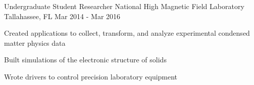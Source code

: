 \begin{cventries}
  \cventry
  {Undergraduate Student Researcher} %
  {National High Magnetic Field Laboratory} %
  {Tallahassee, FL} %
  {Mar 2014 - Mar 2016} %
  {
    \begin{cvitems} %
      \item {Created applications to collect, transform, and analyze experimental condensed matter physics data}
      \item {Built simulations of the electronic structure of solids}
      \item {Wrote drivers to control precision laboratory equipment}
    \end{cvitems}
  }

\end{cventries}
